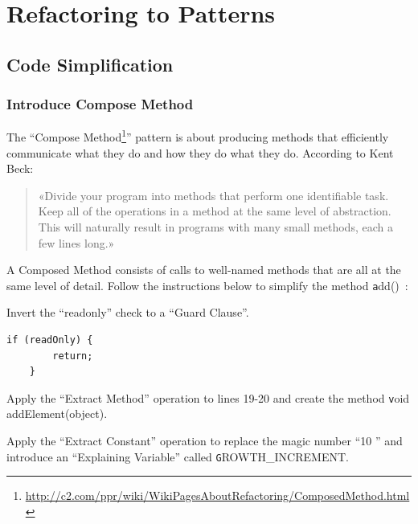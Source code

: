 \documentclass[a4paper,11pt]{memoir}
\newcommand{\code}[1]{{\texttt #1}}
\begin{document}
\chapter{Refactoring to Patterns}

\section{Code Simplification}
\subsection{Introduce Compose Method}
The ``Compose Method\footnote{\url{http://c2.com/ppr/wiki/WikiPagesAboutRefactoring/ComposedMethod.html}}'' pattern is about producing methods that efficiently communicate what they do and how they do what they do. 
According to Kent Beck:

\begin{quotation}
	«Divide your program into methods that perform one identifiable task. Keep all of the operations in a method at the same level of abstraction. 
	This will naturally result in programs with many small methods, each a few lines long.»
\end{quotation}

A Composed Method consists of calls to well-named methods that are all at the same level of detail.
Follow the instructions below to simplify the method \code{add()}~\cite{Kerievsky:2004}:



\begin{exercise}
	Invert the ``readonly'' check to a ``Guard Clause''.
\end{exercise}

\begin{solution}
\begin{lstlisting}[caption=cap,label=lst:lab]
    if (readOnly) {
        return;
    }
\end{lstlisting}

\end{solution}

\begin{exercise}
	Apply the ``Extract Method'' operation to lines 19-20 and create the method \code{void addElement(object)}.
\end{exercise}

\begin{exercise}
	Apply the ``Extract Constant'' operation to replace the magic number ``10 '' and introduce an ``Explaining Variable'' called \code{GROWTH\_INCREMENT}.
\end{exercise}
\end{document}
